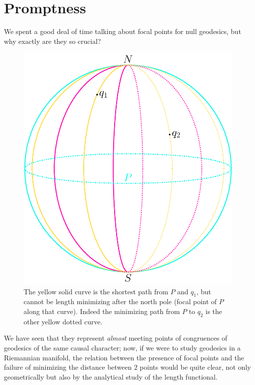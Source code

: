 \section{Promptness}
\label{sec:promptness}

We spent a good deal of time talking about focal points for null geodesics, but why exactly are they so crucial?

\begin{figure}
\centering
\includegraphics[scale=0.62]{Immagini/sphere-focal-points/sphere-focal-points.pdf}
\caption[]{The yellow solid curve is the shortest path from \(P\) and \(q_1\), but cannot be length minimizing after the north pole (focal point of \(P\) along that curve). Indeed the minimizing path from \(P\) to \(q_2\) is the other yellow dotted curve.}
\label{fig:sphere-focal-points}
\end{figure}

We have seen that they represent \emph{almost} meeting points of congruences of geodesics of the same causal character; now, if we were to study geodesics in a Riemannian manifold, the relation between the presence of focal points and the failure of minimizing the distance between \(2\) points would be quite clear, not only geometrically but also by the analytical study of the length functional.

